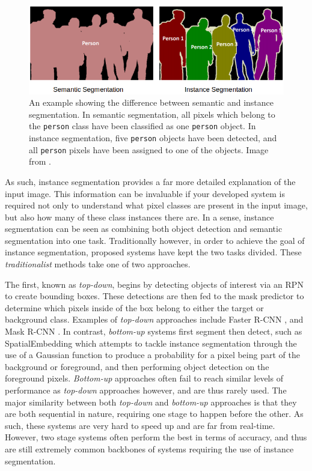 \begin{figure}
	\begin{center}
		\includegraphics[scale=0.5]{Chapter2/figs/semantic_vs_instance_segmentation.png}
	\end{center}
	\caption{An example showing the difference between semantic and instance segmentation. In semantic segmentation, all pixels which belong to the \texttt{person} class have been classified as one \texttt{person} object. In instance segmentation, five \texttt{person} objects have been detected, and all \texttt{person} pixels have been assigned to one of the objects. Image from \cite{sharma_image_2019}.}
	\label{fig:instance-vs-semantic}
\end{figure}

As such, instance segmentation provides a far more detailed explanation of the input image. This information can be invaluable if your developed system is required not only to understand what pixel classes are present in the input image, but also how many of these class instances there are. In a sense, instance segmentation can be seen as combining both object detection and semantic segmentation into one task. Traditionally however, in order to achieve the goal of instance segmentation, proposed systems have kept the two tasks divided. These \textit{traditionalist} methods take one of two approaches. 

The first, known as \textit{top-down}, begins by detecting objects of interest via an RPN to create bounding boxes. These detections are then fed to the mask predictor to determine which pixels inside of the box belong to either the target or background class. Examples of \textit{top-down} approaches include Faster R-CNN \cite{ren_faster_2015}, and Mask R-CNN \cite{he_mask_2017}. In contrast, \textit{bottom-up} systems first segment then detect, such as SpatialEmbedding \cite{neven_instance_2019} which attempts to tackle instance segmentation through the use of a Gaussian function to produce a probability for a pixel being part of the background or foreground, and then performing object detection on the foreground pixels. \textit{Bottom-up} approaches often fail to reach similar levels of performance as \textit{top-down} approaches however, and are thus rarely used. The major similarity between both \textit{top-down} and \textit{bottom-up} approaches is that they are both sequential in nature, requiring one stage to happen before the other. As such, these systems are very hard to speed up and are far from real-time. However, two stage systems often perform the best in terms of accuracy, and thus are still extremely common backbones of systems requiring the use of instance segmentation. 

